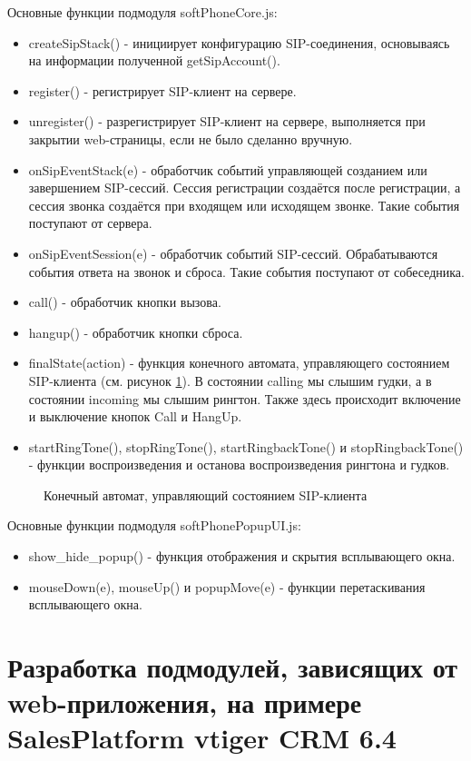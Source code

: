 Основные функции подмодуля softPhoneCore.js:
\begin{itemize}
\item createSipStack() - инициирует конфигурацию SIP-соединения, основываясь на информации полученной getSipAccount().
\item register() - регистрирует SIP-клиент на сервере.
\item unregister() - разрегистрирует SIP-клиент на сервере, выполняется при закрытии web-страницы, если не было сделанно вручную.
\item onSipEventStack(e) - обработчик событий управляющей созданием или завершением SIP-сессий. Сессия регистрации создаётся после регистрации, а сессия звонка создаётся при входящем или исходящем звонке. Такие события поступают от сервера.
\item onSipEventSession(e) - обработчик событий SIP-сессий. Обрабатываются события ответа на звонок и сброса. Такие события поступают от собеседника.
\item call() - обработчик кнопки вызова.
\item hangup() - обработчик кнопки сброса.
\item finalState(action) - функция конечного автомата, управляющего состоянием SIP-клиента (см. рисунок \ref{image:FinalState}). В состоянии calling мы слышим гудки, а в состоянии incoming мы слышим рингтон. Также здесь происходит включение и выключение кнопок Call и HangUp.
\item startRingTone(), stopRingTone(), startRingbackTone() и stopRingbackTone() - функции воспроизведения и останова воспроизведения рингтона и гудков.
\end{itemize}

\begin{figure}[h!]
\caption{Конечный автомат, управляющий состоянием SIP-клиента}
\label{image:FinalState}
\end{figure}

Основные функции подмодуля softPhonePopupUI.js:
\begin{itemize}
\item show\_hide\_popup() - функция отображения и скрытия всплывающего окна.
\item mouseDown(e), mouseUp() и popupMove(e) - функции перетаскивания всплывающего окна.
\end{itemize}

\section{Разработка подмодулей, зависящих от web-приложения, на примере SalesPlatform vtiger CRM 6.4}


